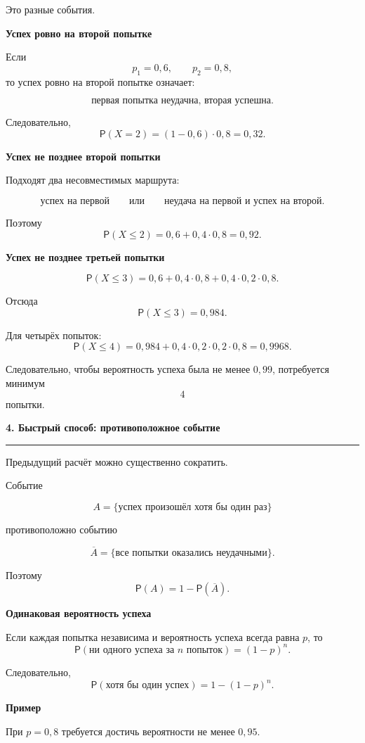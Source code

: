 \documentclass[a4paper,12pt]{article}
\newcommand{\Prob}{\mathsf{P}}
\newcommand{\topichead}[1]{%
  \vspace{0.5em}
  {\Large\bfseries\color{darkaccent}#1\par}
  \vspace{0.35em}
  {\color{accent}\rule{\linewidth}{0.7pt}}
  \vspace{0.5em}
}
\newcommand{\subtopic}[1]{%
  \vspace{0.4em}
  {\large\bfseries\color{darkaccent}#1\par}
  \vspace{0.15em}
}
\begin{document}
Это разные события.

\subtopic{Успех ровно на второй попытке}

Если
\[
p_1=0{,}6,
\qquad
p_2=0{,}8,
\]
то успех ровно на второй попытке означает:

\[
\text{первая попытка неудачна, вторая успешна}.
\]

Следовательно,
\[
\Prob(X=2)
=
(1-0{,}6)\cdot0{,}8
=
0{,}32.
\]

\subtopic{Успех не позднее второй попытки}

Подходят два несовместимых маршрута:

\[
\text{успех на первой}
\qquad\text{или}\qquad
\text{неудача на первой и успех на второй}.
\]

Поэтому
\[
\Prob(X\le2)
=
0{,}6+0{,}4\cdot0{,}8
=
0{,}92.
\]

\subtopic{Успех не позднее третьей попытки}

\[
\Prob(X\le3)
=
0{,}6
+
0{,}4\cdot0{,}8
+
0{,}4\cdot0{,}2\cdot0{,}8.
\]

Отсюда
\[
\Prob(X\le3)
=
0{,}984.
\]

Для четырёх попыток:
\[
\Prob(X\le4)
=
0{,}984
+
0{,}4\cdot0{,}2\cdot0{,}2\cdot0{,}8
=
0{,}9968.
\]

Следовательно, чтобы вероятность успеха была не менее $0{,}99$,
потребуется минимум
\[
\boxed{4}
\]
попытки.


\topichead{4. Быстрый способ: противоположное событие}

Предыдущий расчёт можно существенно сократить.

Событие

\[
A=\{\text{успех произошёл хотя бы один раз}\}
\]

противоположно событию

\[
\overline A=\{\text{все попытки оказались неудачными}\}.
\]

Поэтому
\[
\Prob(A)=1-\Prob(\overline A).
\]

\subtopic{Одинаковая вероятность успеха}

Если каждая попытка независима и вероятность успеха всегда равна $p$, то
\[
\Prob(\text{ни одного успеха за }n\text{ попыток})
=
(1-p)^n.
\]

Следовательно,
\[
\boxed{
\Prob(\text{хотя бы один успех})
=
1-(1-p)^n
}.
\]

\subtopic{Пример}

При $p=0{,}8$ требуется достичь вероятности не менее $0{,}95$.
\end{document}

